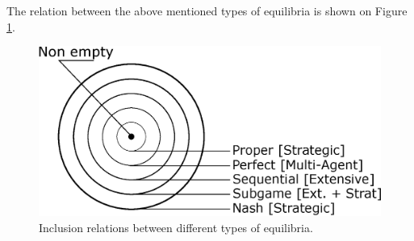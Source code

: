 The relation between the above mentioned types of  equilibria is shown on Figure \ref{ch5:fig:equilibriaRelation}.

\begin{figure}[!ht]
\centering
\includegraphics[scale=0.7]{equilibriaRelation.eps}
\caption{Inclusion relations between different types of equilibria.}
\label{ch5:fig:equilibriaRelation}
\end{figure} 






\ifx \globalmark \undefined %


	
\else 
	
\fi
